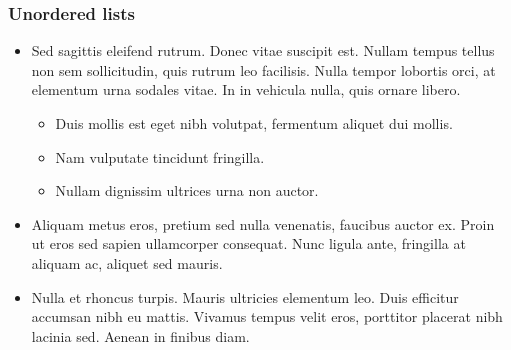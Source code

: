 \documentclass[letterpaper,10pt,english]{sphinxmanual}
\begin{document}
\subsubsection{Unordered lists}
\label{\detokenize{markdown:unordered-lists}}\begin{itemize}
\item {} 
Sed sagittis eleifend rutrum. Donec vitae suscipit est. Nullam tempus tellus
non sem sollicitudin, quis rutrum leo facilisis. Nulla tempor lobortis orci,
at elementum urna sodales vitae. In in vehicula nulla, quis ornare libero.
\begin{itemize}
\item {} 
Duis mollis est eget nibh volutpat, fermentum aliquet dui mollis.

\item {} 
Nam vulputate tincidunt fringilla.

\item {} 
Nullam dignissim ultrices urna non auctor.

\end{itemize}

\item {} 
Aliquam metus eros, pretium sed nulla venenatis, faucibus auctor ex. Proin ut
eros sed sapien ullamcorper consequat. Nunc ligula ante, fringilla at aliquam
ac, aliquet sed mauris.

\item {} 
Nulla et rhoncus turpis. Mauris ultricies elementum leo. Duis efficitur
accumsan nibh eu mattis. Vivamus tempus velit eros, porttitor placerat nibh
lacinia sed. Aenean in finibus diam.

\end{itemize}
\end{document}
